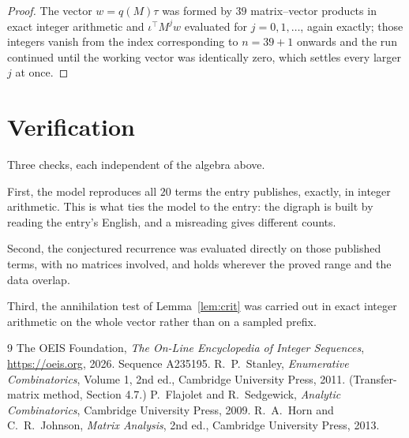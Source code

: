 \documentclass[11pt,a4paper]{article}
\theoremstyle{plain}
\theoremstyle{definition}
\begin{document}
\begin{proof}
The vector $w=q(M)\tau$ was formed by $39$ matrix--vector products in exact integer
arithmetic and $\iota^{\!\top}M^{j}w$ evaluated for $j=0,1,\dots$, again exactly; those
integers vanish from the index corresponding to $n=39+1$ onwards and the run continued
until the working vector was identically zero, which settles every larger $j$ at once.
\end{proof}

\section{Verification}

Three checks, each independent of the algebra above.

First, the model reproduces all $20$ terms the entry publishes, exactly, in integer
arithmetic. This is what ties the model to the entry: the digraph is built by reading the
entry's English, and a misreading gives different counts.

Second, the conjectured recurrence was evaluated directly on those published terms, with no
matrices involved, and holds wherever the proved range and the data overlap.

Third, the annihilation test of Lemma~\ref{lem:crit} was carried out in exact integer
arithmetic on the whole vector rather than on a sampled prefix.

\begin{thebibliography}{9}
 The OEIS Foundation, \emph{The On-Line Encyclopedia of Integer
Sequences}, \url{https://oeis.org}, 2026. Sequence A235195.
 R.~P.~Stanley, \emph{Enumerative Combinatorics}, Volume 1, 2nd ed.,
Cambridge University Press, 2011. (Transfer-matrix method, Section 4.7.)
 P.~Flajolet and R.~Sedgewick, \emph{Analytic Combinatorics}, Cambridge
University Press, 2009.
 R.~A.~Horn and C.~R.~Johnson, \emph{Matrix Analysis}, 2nd ed., Cambridge
University Press, 2013.
\end{thebibliography}
\end{document}
